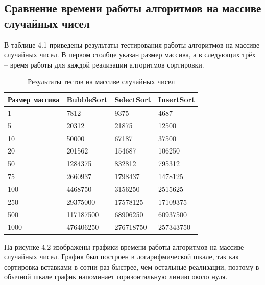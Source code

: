 \subsection{Сравнение времени работы алгоритмов на массиве случайных чисел}
В таблице 4.1 приведены результаты тестирования работы алгоритмов на массиве случайных чисел.
В первом столбце указан размер массива, а в следующих трёх -- время работы для каждой
реализации алгоритмов сортировки.

\FloatBarrier
\begin{table}[h]
	\caption{Результаты тестов на массиве случайных чисел}
	\centering
	\begin{tabular}{ | l | l | l | l |}
		\hline
		Размер массива & BubbleSort & SelectSort & InsertSort \\ \hline
		1 & 7812 & 9375 & 4687 \\
		5 & 20312 & 21875 & 12500 \\
		10 & 50000 & 67187 &  37500 \\
		20 & 201562 & 154687 & 106250 \\
		50 & 1284375 & 832812 & 795312 \\
		75 & 2660937 & 1798437 & 1478125 \\
		100 & 4468750 & 3156250 & 2515625 \\
		250 & 29375000 & 17578125 & 17109375 \\
		500 & 117187500 & 68906250 & 60937500 \\
		1000 & 476406250 & 276718750 & 257343750 \\
		\hline
	\end{tabular}
\end{table}
\FloatBarrier

На рисунке 4.2 изображены графики времени работы алгоритмов на массиве случайных чисел.
График был построен в логарифмической шкале, так как сортировка вставками в сотни раз быстрее, чем
остальные реализации, поэтому в обычной шкале график напоминает горизонтальную линию около нуля.

